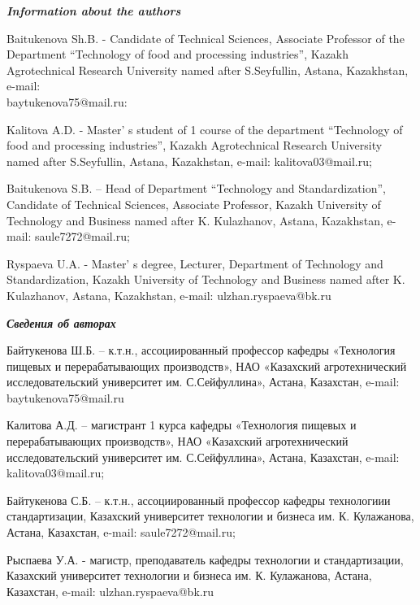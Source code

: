 \begin{authorinfo}
\emph{{\bfseries Information about the authors}}

Baitukenova Sh.B. - Candidate of Technical Sciences, Associate Professor
of the Department ``Technology of food and process\-ing industries'',
Kazakh Agrotechnical Research University named after S.Seyfullin,
Astana, Kazakhstan, e-mail: \\baytukenova75@mail.ru:

Kalitova A.D. - Master' s student of 1 course of the
department ``Technology of food and processing industries'', Kazakh
Agrotechnical Research University named after S.Seyfullin, Astana,
Kazakhstan, e-mail: kalitova03@mail.ru;

Baitukenova S.B. -- Head of Department ``Technology and
Standardization'', Candidate of Technical Sciences, Associate Profes\-sor,
Kazakh University of Technology and Business named after K. Kulazhanov,
Astana, Kazakhstan, e-mail: saule7272@mail.ru;

Ryspaeva U.A. - Master' s degree, Lecturer, Department of
Technology and Standardization, Kazakh University of Technology and
Business named after K. Kulazhanov, Astana, Kazakhstan, e-mail:
ulzhan.ryspaeva@bk.ru

\emph{{\bfseries Сведения об авторах}}

Байтукенова Ш.Б. -- к.т.н., ассоциированный профессор кафедры
«Технология пищевых и перерабатывающих производств», НАО «Казахский
агротехнический исследовательский университет им. С.Сейфуллина», Астана,
Казахстан, e-mail: baytukenova75@mail.ru

Калитова А.Д. -- магистрант 1 курса кафедры «Технология пищевых и
перерабатывающих производств», НАО «Казахский агротехнический
исследовательский университет им. С.Сейфуллина», Астана, Казахстан,
e-mail: kalitova03@mail.ru;

Байтукенова С.Б. -- к.т.н., ассоциированный профессор кафедры
технологиии стандартизации, Казахский университет технологии и бизнеса
им. К. Кулажанова, Астана, Казахстан, e-mail: saule7272@mail.ru;

Рыспаева У.А. - магистр, преподаватель кафедры технологии и
стандартизации, Казахский университет технологии и бизнеса им. К.
Кулажанова, Астана, Казахстан, e-mail: ulzhan.ryspaeva@bk.ru
\end{authorinfo}
